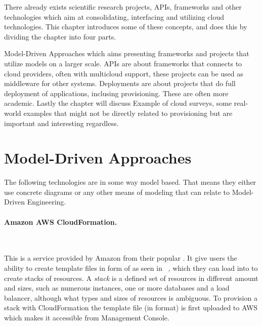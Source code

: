 
There already exists scientific research projects, APIs, frameworks 
and other technologies which aim at consolidating, interfacing and utilizing cloud technologies.
This chapter introduces some of these concepts, and does this by dividing the chapter into four parts.
\begin{ii}
  \iitem Model-Driven Approaches which aims presenting frameworks and projects that utilize
  models on a larger scale.
  \iitem APIs are about frameworks that connects to cloud providers, often with multicloud support,
  these projects can be used as middleware for other systems.
  \iitem Deployments are about projects that do full deployment of applications, inclusing provisioning.
  These are often more academic.
  Lastly the chapter will discuss \iitem Example of cloud surveys, some real-world examples
  that might not be directly related to provisioning but are important and interesting regardless.
\end{ii}

\section{Model-Driven Approaches}

The following technologies are in some way model based.
That means they either use concrete diagrams or any other means of
modeling that can relate to Model-Driven Engineering.

\paragraph{Amazon AWS CloudFormation.}~\cite{aws}



This is a service provided by Amazon from their popular .
It give users the ability to create template files in form of 
 as seen in ~, 
which they can load into  to create stacks of resources. 
A \emph{stack} is a defined set of resources in different amount and sizes, 
such as numerous instances,
one or more databases and a load balancer, although what types and sizes of resources is ambiguous.
To provision a stack with CloudFormation the template file (in  format) is first uploaded to
AWS which makes it accessible from  Management Console.

